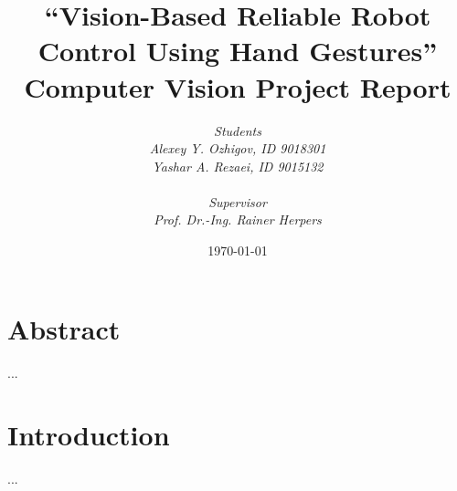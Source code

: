 \documentclass[a4paper, 12pt]{article}
\begin{document}
\title{\textbf{``Vision-Based Reliable Robot Control Using Hand Gestures''}\\
\vspace{1cm} \large Computer Vision Project Report }\vspace{1cm} 
\author{\it{Students} \\Alexey Y. Ozhigov, ID 9018301
                  \\Yashar A. Rezaei, ID 9015132\\
                    \vspace{0.1cm}\\
                     \it{Supervisor}\\
                    Prof. Dr.-Ing. Rainer Herpers}
\date{\today}
\maketitle
\section{Abstract}
...
\section{Introduction}
...
\end{document}
